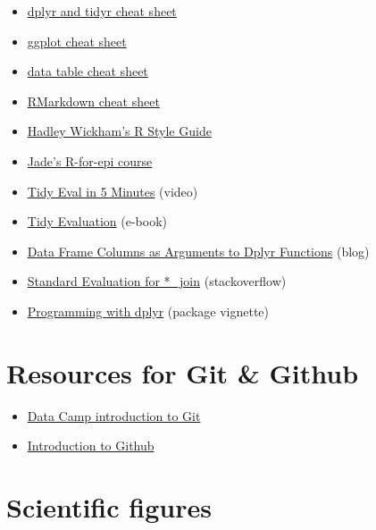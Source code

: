 \documentclass[
]{book}
\providecommand{\tightlist}{%
  \setlength{\itemsep}{0pt}\setlength{\parskip}{0pt}}
\begin{document}
\begin{itemize}
\tightlist
\item
  \href{https://www.rstudio.com/wp-content/uploads/2015/02/data-wrangling-cheatsheet.pdf}{dplyr and tidyr cheat sheet}
\item
  \href{https://www.rstudio.com/wp-content/uploads/2015/03/ggplot2-cheatsheet.pdf}{ggplot cheat sheet}
\item
  \href{https://s3.amazonaws.com/assets.datacamp.com/blog_assets/datatable_Cheat_Sheet_R.pdf}{data table cheat sheet}
\item
  \href{https://www.rstudio.com/wp-content/uploads/2015/02/rmarkdown-cheatsheet.pdf}{RMarkdown cheat sheet}
\item
  \href{http://adv-r.had.co.nz/Style.html}{Hadley Wickham's R Style Guide}
\item
  \href{https://ucb-epi-r.github.io}{Jade's R-for-epi course}
\item
  \href{https://www.youtube.com/watch?v=nERXS3ssntw}{Tidy Eval in 5 Minutes} (video)
\item
  \href{https://tidyeval.tidyverse.org/index.html}{Tidy Evaluation} (e-book)
\item
  \href{https://www.brodrigues.co/blog/2016-07-18-data-frame-columns-as-arguments-to-dplyr-functions/}{Data Frame Columns as Arguments to Dplyr Functions} (blog)
\item
  \href{https://stackoverflow.com/questions/28125816/r-standard-evaluation-for-join-dplyr}{Standard Evaluation for *\_join} (stackoverflow)
\item
  \href{https://dplyr.tidyverse.org/articles/programming.html}{Programming with dplyr} (package vignette)
\end{itemize}

\hypertarget{resources-for-git-github}{%
\section{Resources for Git \& Github}\label{resources-for-git-github}}

\begin{itemize}
\tightlist
\item
  \href{https://www.datacamp.com/courses/introduction-to-git-for-data-science}{Data Camp introduction to Git}
\item
  \href{https://lab.github.com/githubtraining/introduction-to-github}{Introduction to Github}
\end{itemize}

\hypertarget{scientific-figures}{%
\section{Scientific figures}\label{scientific-figures}}
\end{document}
